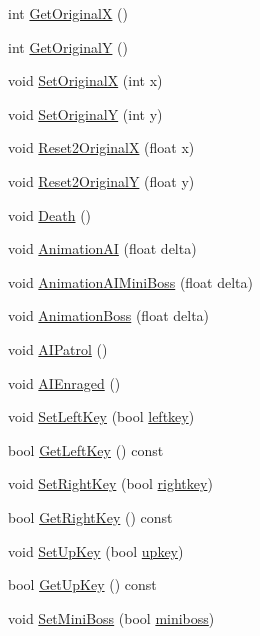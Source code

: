 \begin{DoxyCompactItemize}
int \hyperlink{classAI_a2652ab0999a03f538c9f3b5706a4022e}{Get\+OriginalX} ()
\item 
int \hyperlink{classAI_a9048855bd39d76f5c6eb71bffd94b545}{Get\+OriginalY} ()
\item 
void \hyperlink{classAI_a5a76a0c5030dcbe0ab3a59e26ca0908a}{Set\+OriginalX} (int x)
\item 
void \hyperlink{classAI_ab9ca5d112a4b790549d1db387802b849}{Set\+OriginalY} (int y)
\item 
void \hyperlink{classAI_a9e60e3da7ae96c1a7bc5dbff38c4128e}{Reset2\+OriginalX} (float x)
\item 
void \hyperlink{classAI_ac0f90e7b4065125014f476b2132e61ed}{Reset2\+OriginalY} (float y)
\item 
void \hyperlink{classAI_a59b0db7fd1d68dd2724d2da0f6e37bda}{Death} ()
\item 
void \hyperlink{classAI_a8d7eba7842ac12a513bff9ac31afac9d}{Animation\+AI} (float delta)
\item 
void \hyperlink{classAI_a00eb52508c12ac57d2e6de304f0eb0c6}{Animation\+A\+I\+Mini\+Boss} (float delta)
\item 
void \hyperlink{classAI_a935f110e6b65684db196569228325c2e}{Animation\+Boss} (float delta)
\item 
void \hyperlink{classAI_a09030418ab60079321ccb0bbee7f5267}{A\+I\+Patrol} ()
\item 
void \hyperlink{classAI_a5ed430bba92b7a7183337257d78a189b}{A\+I\+Enraged} ()
\item 
void \hyperlink{classAI_abcb80800d582425bcca0e6265ff5c771}{Set\+Left\+Key} (bool \hyperlink{classAI_af4a6576f510ed03a56c98bfc5b711f1a}{leftkey})
\item 
bool \hyperlink{classAI_a0d8e57db11f22335ef2a7dcf3408ea6b}{Get\+Left\+Key} () const 
\item 
void \hyperlink{classAI_abacb14347200b16386e21d7977b51f85}{Set\+Right\+Key} (bool \hyperlink{classAI_afd8bf97dd365a456af724aade73129fb}{rightkey})
\item 
bool \hyperlink{classAI_aeb518aba00b996380158b247aa1dca7f}{Get\+Right\+Key} () const 
\item 
void \hyperlink{classAI_ab4061283b1ef4cb50b6d7110882c20ab}{Set\+Up\+Key} (bool \hyperlink{classAI_a1bde8ebcfb666d83ffb7e71993bf06fc}{upkey})
\item 
bool \hyperlink{classAI_a2e3c9d6a73594994858c13bfffaa7450}{Get\+Up\+Key} () const 
\item 
void \hyperlink{classAI_acf469b2d4b6bfa66ebf81cffce614b35}{Set\+Mini\+Boss} (bool \hyperlink{classAI_aee02bf098d14d402140bdeb9516280f9}{miniboss})

\end{DoxyCompactItemize}
